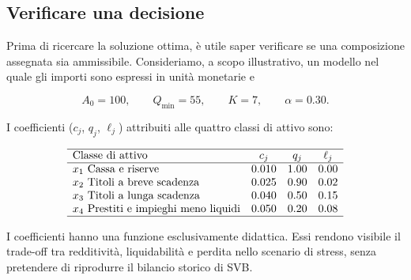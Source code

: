 \subsection{Verificare una decisione}

Prima di ricercare la soluzione ottima, \`e utile saper verificare se una
composizione assegnata sia ammissibile. Consideriamo, a scopo illustrativo,
un modello nel quale gli importi sono espressi in unit\`a monetarie e

\[
A_0=100,
\qquad
Q_{\min}=55,
\qquad
K=7,
\qquad
\alpha=0.30.
\]

I coefficienti ($c_j$, $q_j$, $\ell_j$) attribuiti alle quattro classi di attivo sono:

\[
\begin{array}{lccc}
\hline
\text{Classe di attivo}
&
c_j
&
q_j
&
\ell_j
\\
\hline
\text{$x_1$ Cassa e riserve}
&
0.010
&
1.00
&
0.00
\\
\text{$x_2$ Titoli a breve scadenza}
&
0.025
&
0.90
&
0.02
\\
\text{$x_3$ Titoli a lunga scadenza}
&
0.040
&
0.50
&
0.15
\\
\text{$x_4$ Prestiti e impieghi meno liquidi}
&
0.050
&
0.20
&
0.08
\\
\hline
\end{array}
\]

I coefficienti hanno una funzione esclusivamente didattica. Essi rendono
visibile il trade-off tra redditivit\`a, liquidabilit\`a e perdita nello
scenario di stress, senza pretendere di riprodurre il bilancio storico di SVB.

